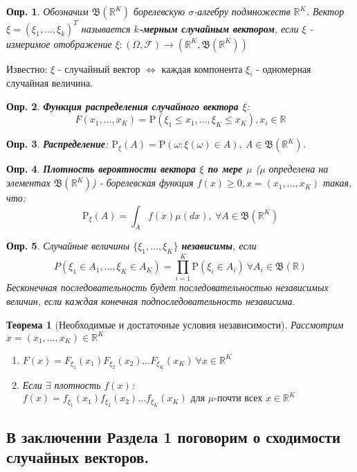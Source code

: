\documentclass[12pt]{article}
\newtheorem{definition}{Опр.}
\theoremstyle{basic_theorem}
\theoremstyle{name_theorem}
\newtheorem*{named_theorem}{Теорема}
\newcommand\defin[1]{\textbf{#1}}
\def\R{
    \mathbb{R}
}
\def\P{
    \mathrm{P}
}
\def\F{
    \mathcal{F}
}
\def\B{
    \mathfrak{B}
}
\begin{document}
\begin{definition}
    Обозначим $\B(\R^K)$ борелевскую $\sigma$-алгебру подмножеств $\R^K$.
    Вектор $\xi = (\xi_1, \ldots, \xi_k)^T$ называется \defin{$k$-мерным случайным
    вектором}, если $\xi$ - измеримое отображение $\xi: (\Omega, \F) \rightarrow (\R^K, \B(\R^K))$
\end{definition}
    Известно: $\xi$ - случайный вектор $\Leftrightarrow$ каждая
    компонента $\xi_i$ - одномерная случайная величина.
\begin{definition}
    \defin{Функция распределения случайного вектора $\xi$}:
    $$F(x_1, \ldots, x_K) = \P(\xi_1 \leq x_1, \ldots, \xi_K \leq x_K), x_i\in\R$$
\end{definition}
\begin{definition}    
    \defin{Распределение}: $\P_\xi(A) = \P(\omega: \xi(\omega) \in A), \ A \in \B(\R^K)$.
\end{definition}
\begin{definition}
    \defin{Плотность вероятности вектора $\xi$ по мере $\mu$} ($\mu$ определена на элементах $\B(\R^K)$)
    - борелевская функция $f(x)\geq 0, x = (x_1, \ldots, x_K)$ такая, что:
    $$\P_\xi(A) = \int_Af(x)\mu(dx), \ \forall A \in \B(\R^K)$$
\end{definition}
\begin{definition}
    Случайные величины $\{\xi_1, \ldots, \xi_K\}$ \defin{независимы}, если
    $$P(\xi_1 \in A_1, \ldots, \xi_K \in A_K) = \prod_{i = 1}^K \P(\xi_i \in A_i) \ \forall A_i \in \B(\R) $$
    Бесконечная последовательность будет последовательностью независимых величин,
    если каждая конечная подпоследовательность независима.
\end{definition}
\begin{named_theorem}[Необходимые и достаточные условия независимости]
    Рассмотрим $x = (x_1, \ldots, x_K) \in \R^K$
    \begin{enumerate}
        \item $F(x) = F_{\xi_1}(x_1)F_{\xi_2}(x_2)\ldots F_{\xi_K}(x_K) \ \forall x \in \R^K$
        \item Если $\exists$ плотность $f(x)$:
        $f(x) = f_{\xi_1}(x_1)f_{\xi_2}(x_2)\ldots f_{\xi_K}(x_K) \mbox{ для $\mu$-почти всех } x \in \R^K$
    \end{enumerate}
\end{named_theorem}

\subsection*{В заключении Раздела 1 поговорим о сходимости случайных векторов.}
\end{document}
